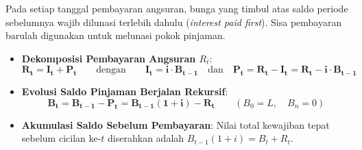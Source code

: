 \documentclass[10pt,a4paper]{article}
\begin{document}
\begin{rumusbox}
Pada setiap tanggal pembayaran angsuran, bunga yang timbul atas saldo periode sebelumnya wajib dilunasi terlebih dahulu (\textit{interest paid first}). Sisa pembayaran barulah digunakan untuk melunasi pokok pinjaman.
\begin{itemize}[leftmargin=1.5em, topsep=1.5pt, itemsep=2pt]
    \item \textbf{Dekomposisi Pembayaran Angsuran $R_t$}:
    \begin{equation*}
        \mathbf{R_t = I_t + P_t} \qquad\text{dengan}\qquad \mathbf{I_t = i \cdot B_{t-1}} \quad\text{dan}\quad \mathbf{P_t = R_t - I_t = R_t - i \cdot B_{t-1}}
    \end{equation*}
    \item \textbf{Evolusi Saldo Pinjaman Berjalan Rekursif}:
    \begin{equation*}
        \mathbf{B_t = B_{t-1} - P_t = B_{t-1}(1+i) - R_t} \qquad (B_0 = L, \quad B_n = 0)
    \end{equation*}
    \item \textbf{Akumulasi Saldo Sebelum Pembayaran}: Nilai total kewajiban tepat sebelum cicilan ke-$t$ diserahkan adalah $B_{t-1}(1+i) = B_t + R_t$.
\end{itemize}
\end{rumusbox}
\end{document}
